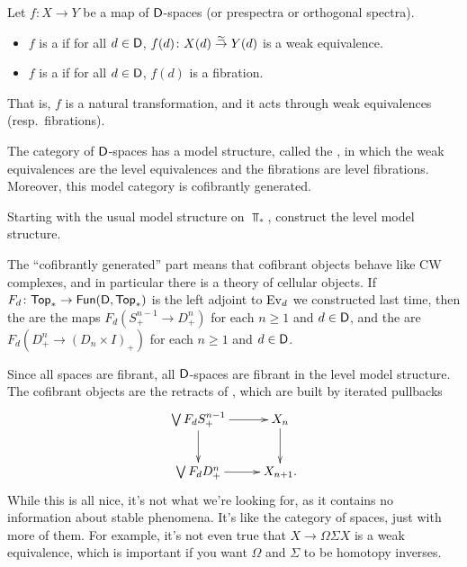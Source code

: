 \begin{defn}
Let $f\colon X\to Y$ be a map of $\mathsf D$-spaces (or prespectra or orthogonal spectra).
\begin{itemize}
	\item $f$ is a  if for all $d\in\mathsf D$, $f(d)\colon X(d)\stackrel\simeq\to Y(d)$ is a weak
	equivalence.
	\item $f$ is a  if for all $d\in\mathsf D$, $f(d)$ is a fibration.
\end{itemize}
\end{defn}
That is, $f$ is a natural transformation, and it acts through weak equivalences (resp.\ fibrations).
\begin{thm}
The category of $\mathsf D$-spaces has a model structure, called the , in which the weak
equivalences are the level equivalences and the fibrations are level fibrations. Moreover, this model category is
cofibrantly generated.
\end{thm}
\begin{ex}
Starting with the usual model structure on $\Top_*$, construct the level model structure.
\end{ex}
The ``cofibrantly generated'' part means that cofibrant objects behave like CW complexes, and in particular there
is a theory of cellular objects. If $F_d\colon\mathsf{Top}_*\to\mathsf{Fun}(\mathsf D,\mathsf{Top}_*)$ is the left adjoint to $\operatorname{Ev}_d$ we
constructed last time, then the  are the maps $F_d(S_+^{n-1}\to D_+^n)$ for each
$n\ge 1$ and $d\in\mathsf D$, and the  are $F_d(D_+^n\to (D_n\times I)_+)$ for each $n\ge 1$
and $d\in\mathsf D$.

Since all spaces are fibrant, all $\mathsf D$-spaces are fibrant in the level model structure. The cofibrant objects are
the retracts of , which are built by iterated pullbacks
\[\xymatrix{
	\bigvee F_d S_+^{n-1}\ar[r]\ar[d] & X_n\ar[d]\\
	\bigvee F_dD_+^n\ar[r] & X_{n+1}.
}\]
While this is all nice, it's not what we're looking for, as it contains no information about stable phenomena. It's
like the category of spaces, just with more of them. For example, it's not even true that $X\to\Omega\Sigma X$ is a
weak equivalence, which is important if you want $\Omega$ and $\Sigma$ to be homotopy inverses.

